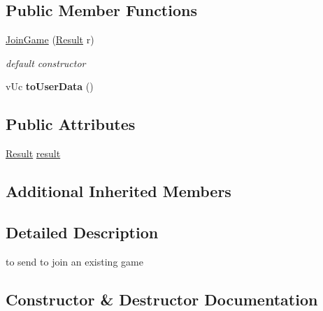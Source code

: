 \subsection*{Public Member Functions}
\begin{DoxyCompactItemize}
\item 
\hyperlink{class_network_1_1_messages_1_1_join_game_a09977e776fc61a84887968057f2d8f17}{Join\+Game} (\hyperlink{class_network_1_1_messages_1_1_base_a646d774928c7dfac987228f26ab5d46a}{Result} r)
\begin{DoxyCompactList}\small\item\em default constructor \end{DoxyCompactList}\item 
\mbox{\label{class_network_1_1_messages_1_1_join_game_ac9dfbf61ace42e5280ced83da9ba0815}} 
v\+Uc {\bfseries to\+User\+Data} ()
\end{DoxyCompactItemize}
\subsection*{Public Attributes}
\begin{DoxyCompactItemize}
\item 
\hyperlink{class_network_1_1_messages_1_1_base_a646d774928c7dfac987228f26ab5d46a}{Result} \hyperlink{class_network_1_1_messages_1_1_join_game_a84370a9ca78dc37baa67e638bcddcc3d}{result}
\end{DoxyCompactItemize}
\subsection*{Additional Inherited Members}


\subsection{Detailed Description}
to send to join an existing game 

\subsection{Constructor \& Destructor Documentation}
\mbox{\label{class_network_1_1_messages_1_1_join_game_a09977e776fc61a84887968057f2d8f17}} 
